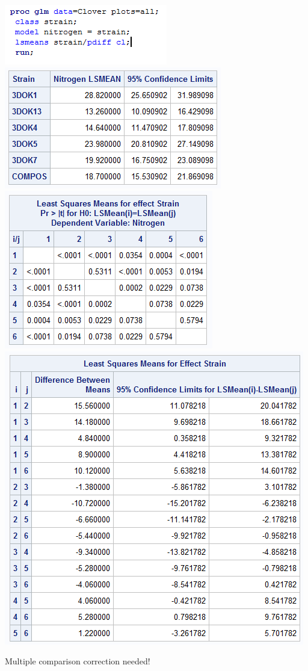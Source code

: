 \begin{center}
\includegraphics[scale=0.8]{cloverdiff0}\includegraphics[scale=0.8]{cloverdiff1}\\
\includegraphics[scale=0.7]{cloverdiff2}\includegraphics[scale=0.7]{cloverdiff3}
\end{center}

Multiple comparison correction needed!

